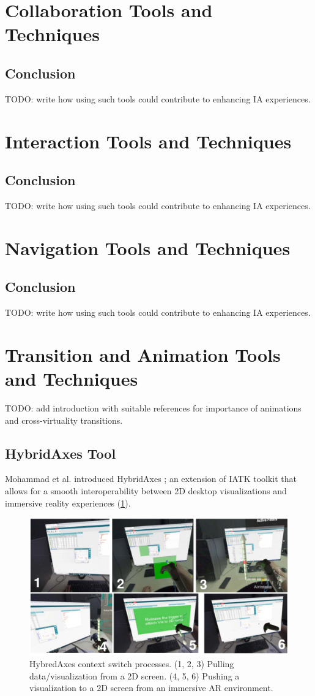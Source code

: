 \documentclass{vgtc}                          %
\begin{document}
\section{Collaboration Tools and Techniques}
\subsection{Conclusion}
TODO: write how using such tools could contribute to enhancing IA experiences.
\section{Interaction Tools and Techniques}
\subsection{Conclusion}
TODO: write how using such tools could contribute to enhancing IA experiences.
\section{Navigation Tools and Techniques}
\subsection{Conclusion}
TODO: write how using such tools could contribute to enhancing IA experiences.
\section{Transition and Animation Tools and Techniques}
TODO: add introduction with suitable references for importance of animations
and cross-virtuality transitions.
\subsection{HybridAxes Tool}
Mohammad et al. introduced HybridAxes \cite{hybridaxes_tool}; an extension of
IATK toolkit that allows for a smooth interoperability between 2D desktop
visualizations and immersive reality experiences (\cref{fig:hybridaxes}).

\medskip

\begin{figure}[tb]
	\centering
	\includegraphics[width=\columnwidth]{hybridaxes}
	\caption[Caption for RagRug]{HybredAxes context switch processes. (1, 2, 3)
		Pulling data/visualization from a 2D screen. (4, 5, 6) Pushing a
		visualization to a 2D screen from an immersive AR environment.}
	\label{fig:hybridaxes}
\end{figure}
\end{document}
